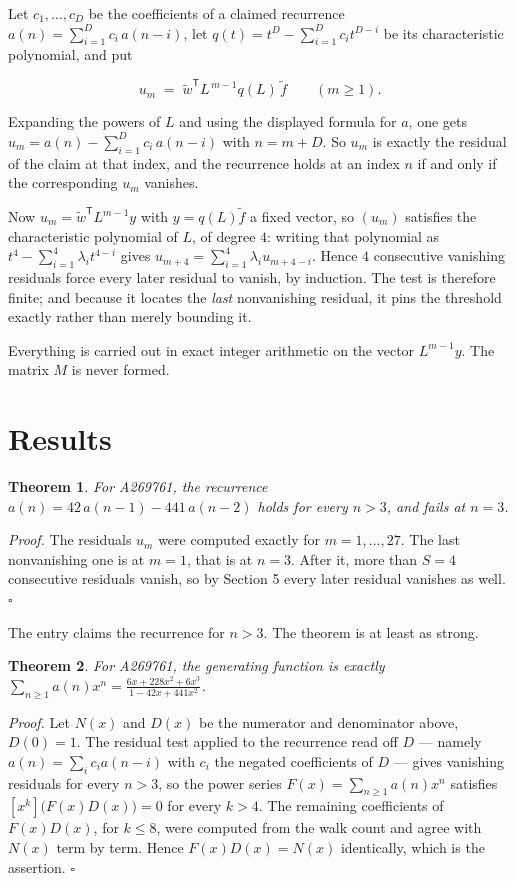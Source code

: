 \documentclass[11pt]{article}
\newtheorem{theorem}{Theorem}
\theoremstyle{definition}
\begin{document}
Let $c_1,\dots,c_D$ be the coefficients of a claimed recurrence $a(n) = \sum_{i=1}^{D} c_i\,a(n-i)$, let $q(t) = t^{D} - \sum_{i=1}^{D} c_i t^{D-i}$ be its characteristic polynomial, and put

\[u_m \;=\; \tilde w^{\mathsf T} L^{\,m-1} q(L)\,\tilde f \qquad (m \ge 1).\]

Expanding the powers of $L$ and using the displayed formula for $a$, one gets $u_m = a(n) - \sum_{i=1}^{D} c_i\,a(n-i)$ with $n = m + D$. So $u_m$ is exactly the residual of the claim at that index, and the recurrence holds at an index $n$ if and only if the corresponding $u_m$ vanishes.

Now $u_m = \tilde w^{\mathsf T} L^{m-1} y$ with $y = q(L)\tilde f$ a fixed vector, so $(u_m)$ satisfies the characteristic polynomial of $L$, of degree $4$: writing that polynomial as $t^{4} - \sum_{i=1}^{4} \lambda_i t^{4-i}$ gives $u_{m+4} = \sum_{i=1}^{4} \lambda_i u_{m+4-i}$. Hence $4$ consecutive vanishing residuals force every later residual to vanish, by induction. The test is therefore finite; and because it locates the {\itshape last} nonvanishing residual, it pins the threshold exactly rather than merely bounding it.

Everything is carried out in exact integer arithmetic on the vector $L^{m-1}y$. The matrix $M$ is never formed.

\section{Results}

\begin{theorem} For A269761, the recurrence $a(n) = 42\,a(n-1) - 441\,a(n-2)$ holds for every $n > 3$, and fails at $n = 3$.\end{theorem}

{\itshape Proof.} The residuals $u_m$ were computed exactly for $m = 1,\dots,27$. The last nonvanishing one is at $m = 1$, that is at $n = 3$. After it, more than $S = 4$ consecutive residuals vanish, so by Section 5 every later residual vanishes as well. $\square$

The entry claims the recurrence for $n > 3$. The theorem is at least as strong.

\begin{theorem} For A269761, the generating function is exactly $\sum_{n\ge 1} a(n)x^n = \frac{6x + 228x^{2} + 6x^{3}}{1 - 42x + 441x^{2}}$.\end{theorem}

{\itshape Proof.} Let $N(x)$ and $D(x)$ be the numerator and denominator above, $D(0)=1$. The residual test applied to the recurrence read off $D$ --- namely $a(n) = \sum_i c_i a(n-i)$ with $c_i$ the negated coefficients of $D$ --- gives vanishing residuals for every $n > 3$, so the power series $F(x)=\sum_{n\ge 1}a(n)x^n$ satisfies $[x^k]\bigl(F(x)D(x)\bigr) = 0$ for every $k > 4$. The remaining coefficients of $F(x)D(x)$, for $k \le 8$, were computed from the walk count and agree with $N(x)$ term by term. Hence $F(x)D(x) = N(x)$ identically, which is the assertion. $\square$
\end{document}
